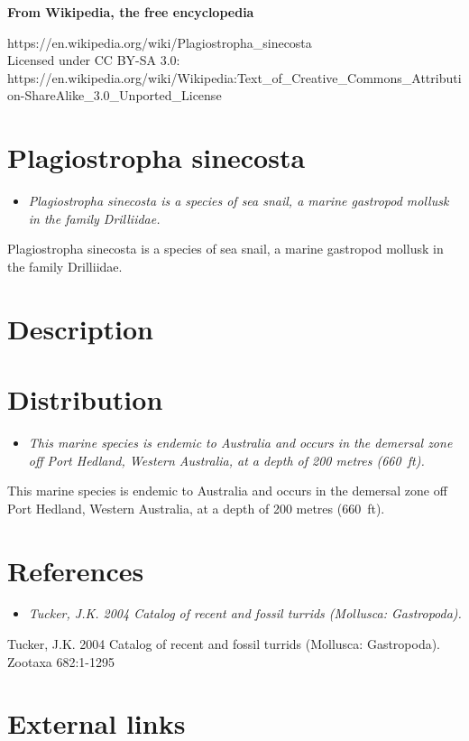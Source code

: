 \textbf{From Wikipedia, the free encyclopedia}

https://en.wikipedia.org/wiki/Plagiostropha\_sinecosta\\
Licensed under CC BY-SA 3.0:\\
https://en.wikipedia.org/wiki/Wikipedia:Text\_of\_Creative\_Commons\_Attribution-ShareAlike\_3.0\_Unported\_License

\section{Plagiostropha sinecosta}\label{plagiostropha-sinecosta}

\begin{itemize}
\item
  \emph{Plagiostropha sinecosta is a species of sea snail, a marine
  gastropod mollusk in the family Drilliidae.}
\end{itemize}

Plagiostropha sinecosta is a species of sea snail, a marine gastropod
mollusk in the family Drilliidae.

\section{Description}\label{description}

\section{Distribution}\label{distribution}

\begin{itemize}
\item
  \emph{This marine species is endemic to Australia and occurs in the
  demersal zone off Port Hedland, Western Australia, at a depth of 200
  metres (660~ft).}
\end{itemize}

This marine species is endemic to Australia and occurs in the demersal
zone off Port Hedland, Western Australia, at a depth of 200 metres
(660~ft).

\section{References}\label{references}

\begin{itemize}
\item
  \emph{Tucker, J.K. 2004 Catalog of recent and fossil turrids
  (Mollusca: Gastropoda).}
\end{itemize}

Tucker, J.K. 2004 Catalog of recent and fossil turrids (Mollusca:
Gastropoda). Zootaxa 682:1-1295

\section{External links}\label{external-links}
